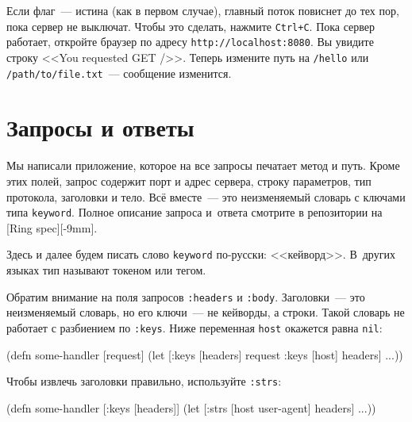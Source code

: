 \fi

Если флаг~--- истина (как в первом случае), главный поток повиснет до тех пор, пока
сервер не выключат. Чтобы это сделать, нажмите \verb|Ctrl+C|. Пока сервер
работает, откройте браузер по адресу \verb|http://localhost:8080|. Вы увидите
строку <<You requested GET />>. Теперь измените путь на \verb|/hello| или
\verb|/path/to/file.txt|~--- сообщение изменится.

\section{Запросы и ответы}

Мы написали приложение, которое на все запросы печатает метод и путь. Кроме этих
полей, запрос содержит порт и адрес сервера, строку параметров, тип протокола,
заголовки и тело. Всё вместе~--- это неизменяемый словарь с ключами типа
\verb|keyword|. Полное описание запроса и~ответа смотрите в репозитории на
[Ring spec][-9mm].

Здесь и далее будем писать слово \verb|keyword| по-русски:
<<кейворд>>. В~других языках тип называют токеном или тегом.


\mnoindent
Обратим внимание на поля запросов \verb|:headers| и \verb|:body|. Заголовки~---
это неизменяемый словарь, но его ключи~--- не кейворды, а строки. Такой словарь не
работает с разбиением по \verb|:keys|. Ниже переменная \verb|host| окажется
равна \verb|nil|:


\begin{english}
  \begin{clojure}
(defn some-handler
  [request]
  (let [{:keys [headers]} request
        {:keys [host]} headers]
    ...))
  \end{clojure}
\end{english}


Чтобы извлечь заголовки правильно, используйте \verb|:strs|:

\ifx\DEVICETYPE\MOBILE

\begin{english}
  \begin{clojure}
(defn some-handler
  [{:keys [headers]}]
  (let [{:strs [host
                user-agent]} headers]
    ...))
  \end{clojure}
\end{english}

